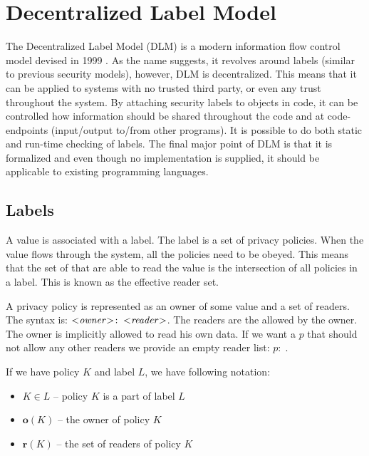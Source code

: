 
\newcommand{\policy}[2]{\ensuremath{#1\!:\;#2}}

\section{Decentralized Label Model}
The Decentralized Label Model (DLM) is a modern information flow control model devised in 1999 \cite{myers1999mostly}.
As the name suggests, it revolves around labels (similar to previous security models), however, DLM is decentralized.
This means that it can be applied to systems with no trusted third party, or even any trust throughout the system.
By attaching security labels to objects in code, it can be controlled how information should be shared throughout the code and at code-endpoints (input/output to/from other programs).
It is possible to do both static and run-time checking of labels.
The final major point of DLM is that it is formalized and even though no implementation is supplied, it should be applicable to existing programming languages.

\newcommand{\xvalue}{value}
\newcommand{\xvalues}{values}

\subsection{Labels}
A \xvalue{} is associated with a label.
The label is a set of privacy policies.
When the \xvalue{} flows through the system, all the policies need to be obeyed.
This means that the set of \principals{} that are able to read the \xvalue{} is the intersection of all policies in a label.
This is known as the effective reader set.

A privacy policy is represented as an owner of some \xvalue{} and a set of readers.
The syntax is: $\policy{\text{<\emph{owner}>}}{\text{<\emph{reader}>}}$.
The readers are the \principals{} allowed by the owner.
The owner is implicitly allowed to read his own data.
If we want a \principal{} $p$ that should not allow any other readers we provide an empty reader list: $\policy{p}{}$.

If we have policy $K$ and label $L$, we have following notation:
\begin{itemize}
\item $K \in L$ -- policy $K$ is a part of label $L$
\item $\textbf{o}(K)$ -- the owner of policy $K$
\item $\textbf{r}(K)$ -- the set of readers of policy $K$
\end{itemize}

